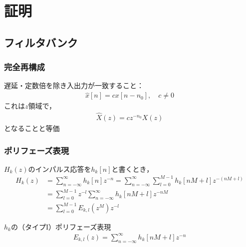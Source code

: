\documentclass[14pt,xcolor=dvipsnames,table,dvipdfmx]{beamer}
\begin{document}
\section{証明}

\subsection{フィルタバンク} \label{sec:proofs_filter_bank}

\begin{frame}[c]
    \frametitle{完全再構成}
    遅延・定数倍を除き入出力が一致すること：
    \begin{align}
        \hat{x}[n] = c x[n - n_{0}], \quad c \neq 0
    \end{align}
    これは$z$領域で，
    \begin{align}
        \hat{X}(z) = c z^{-n_{0}} X(z)
    \end{align}
    となることと等価
\end{frame}

\begin{frame}[c]
    \frametitle{ポリフェーズ表現}
    $H_{k}(z)$のインパルス応答を$h_{k}[n]$と書くとき，
    \small
    \begin{align*}
        H_{k}(z) &= \sum_{n = -\infty}^{\infty} h_{k}[n] z^{-n} = \sum_{n = -\infty}^{\infty} \sum_{l = 0}^{M - 1} h_{k}[nM + l] z^{-(nM+l)} \\
        &= \sum_{l = 0}^{M - 1} z^{-l} \sum_{n = -\infty}^{\infty}h_{k}[nM + l] z^{-nM} \\
        &= \sum_{l = 0}^{M - 1} E_{k,l}(z^{M}) z^{-l}
    \end{align*}
    \normalsize
    \begin{block}{$h_{k}$の（タイプI）ポリフェーズ表現}
        \vspace{-13pt}
        \begin{align}
            E_{k,l}(z) = \sum_{n = -\infty}^{\infty} h_{k}[nM + l] z^{-n} \label{eq:type1_polyphase_representation}
        \end{align}
    \end{block}
\end{frame}
\end{document}

